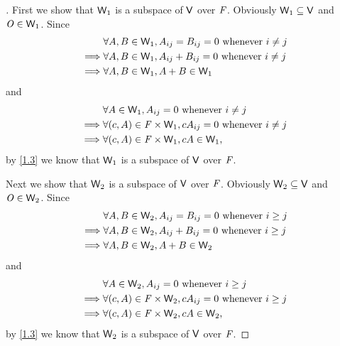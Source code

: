 \begin{proof}[]
  First we show that \(\mathsf{W}_1\) is a subspace of \(\mathsf{V}\) over \(\mathit{F}\).
  Obviously \(\mathsf{W}_1 \subseteq \mathsf{V}\) and \(\mathit{O} \in \mathsf{W}_1\).
  Since
  \begin{align*}
             & \forall A, B \in \mathsf{W}_1, A_{i j} = B_{i j} = 0 \text{ whenever } i \neq j \\
    \implies & \forall A, B \in \mathsf{W}_1, A_{i j} + B_{i j} = 0 \text{ whenever } i \neq j \\
    \implies & \forall A, B \in \mathsf{W}_1, A + B \in \mathsf{W}_1
  \end{align*}
  and
  \begin{align*}
             & \forall A \in \mathsf{W}_1, A_{i j} = 0 \text{ whenever } i \neq j                 \\
    \implies & \forall (c, A) \in \mathit{F} \times \mathsf{W}_1, cA_{i j} = 0 \text{ whenever } i \neq j \\
    \implies & \forall (c, A) \in \mathit{F} \times \mathsf{W}_1, cA \in \mathsf{W}_1,
  \end{align*}
  by \cref{1.3} we know that \(\mathsf{W}_1\) is a subspace of \(\mathsf{V}\) over \(\mathit{F}\).

  Next we show that \(\mathsf{W}_2\) is a subspace of \(\mathsf{V}\) over \(\mathit{F}\).
  Obviously \(\mathsf{W}_2 \subseteq \mathsf{V}\) and \(\mathit{O} \in \mathsf{W}_2\).
  Since
  \begin{align*}
             & \forall A, B \in \mathsf{W}_2, A_{i j} = B_{i j} = 0 \text{ whenever } i \geq j \\
    \implies & \forall A, B \in \mathsf{W}_2, A_{i j} + B_{i j} = 0 \text{ whenever } i \geq j \\
    \implies & \forall A, B \in \mathsf{W}_2, A + B \in \mathsf{W}_2
  \end{align*}
  and
  \begin{align*}
             & \forall A \in \mathsf{W}_2, A_{i j} = 0 \text{ whenever } i \geq j                 \\
    \implies & \forall (c, A) \in \mathit{F} \times \mathsf{W}_2, cA_{i j} = 0 \text{ whenever } i \geq j \\
    \implies & \forall (c, A) \in \mathit{F} \times \mathsf{W}_2, cA \in \mathsf{W}_2,
  \end{align*}
  by \cref{1.3} we know that \(\mathsf{W}_2\) is a subspace of \(\mathsf{V}\) over \(\mathit{F}\).


\end{proof}
